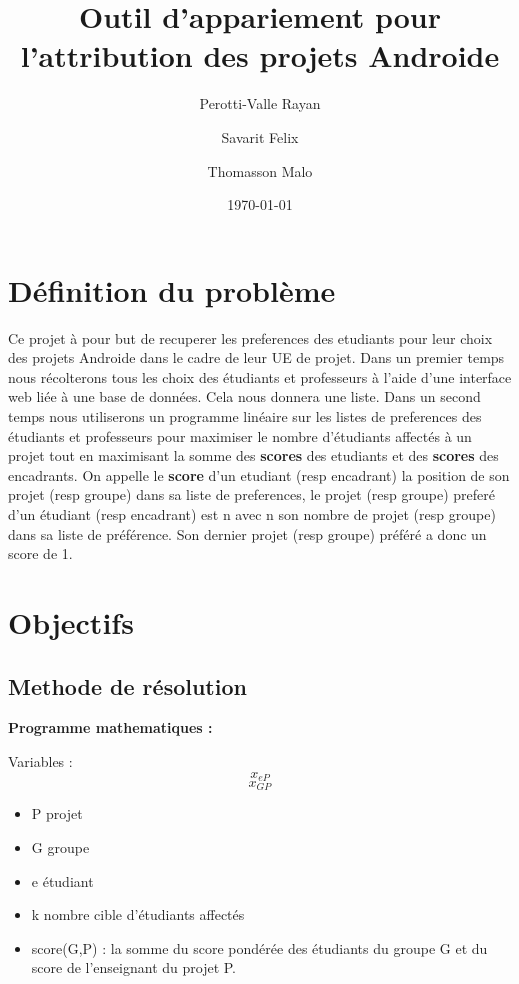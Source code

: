 \documentclass{article}
\title{Outil d'appariement pour l'attribution des projets Androide}
\author{
  Perotti-Valle Rayan \\
  \and
  Savarit Felix \\
  \and
  Thomasson Malo
}
\date{\today}
\begin{document}
\maketitle

\newpage

\renewcommand{\contentsname}{Sommaire} %

\tableofcontents{} %

\newpage

\section{Définition du problème}
Ce projet à pour but de recuperer les preferences des etudiants pour leur choix des projets Androide dans le cadre de leur UE de projet.
Dans un premier temps nous récolterons tous les choix des étudiants et professeurs à l'aide d'une interface web liée à une base de données. Cela nous donnera une liste. 
Dans un second temps nous utiliserons un programme linéaire sur les listes de preferences des étudiants et professeurs pour maximiser le nombre d'étudiants affectés à un projet tout en maximisant la somme des \textbf{scores} des etudiants et des \textbf{scores} des encadrants. On appelle le \textbf{score} d'un etudiant (resp encadrant) la position de son projet (resp groupe) dans sa liste de preferences, le projet (resp groupe) preferé d'un étudiant (resp encadrant) est n avec n son nombre de projet (resp groupe) dans sa liste de préférence. Son dernier projet (resp groupe) préféré a donc un score de 1.

\section{Objectifs}


\subsection{Methode de résolution}


\textbf{Programme mathematiques :}

Variables : \[ x_{eP} \] 
\[ x_{GP} \]
\begin{itemize}
\item P projet
\item G groupe
\item e étudiant
\item k nombre cible d'étudiants affectés
\item score(G,P) : la somme du score pondérée des étudiants du groupe G et du score de l'enseignant du projet P.  
\end{itemize}
\end{document}
